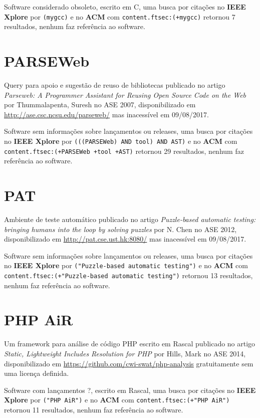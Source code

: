 Software considerado obsoleto,
escrito em C,
uma busca por citações no {\bf IEEE Xplore} por
\texttt{(mygcc)}
e no {\bf ACM} com
\texttt{content.ftsec:(+mygcc)}
retornou
7 resultados,
nenhum faz referência ao software.



\section{PARSEWeb}

Query para apoio e sugestão de reuso de bibliotecas
publicado no artigo {\it Parseweb: A Programmer Assistant for Reusing Open Source Code on the Web}
por Thummalapenta, Suresh
no ASE 2007,
disponibilizado em \url{http://ase.csc.ncsu.edu/parseweb/}
mas inacessível em 09/08/2017.

Software sem informações sobre lançamentos ou releases,
uma busca por citações no {\bf IEEE Xplore} por
\texttt{(((PARSEWeb) AND tool) AND AST)}
e no {\bf ACM} com
\texttt{content.ftsec:(+PARSEWeb +tool +AST)}
retornou
29 resultados,
nenhum faz referência ao software.



\section{PAT}

Ambiente de teste automático
publicado no artigo {\it Puzzle-based automatic testing: bringing humans into the loop by solving puzzles}
por N. Chen
no ASE 2012,
disponibilizado em \url{http://pat.cse.ust.hk:8080/}
mas inacessível em 09/08/2017.

Software sem informações sobre lançamentos ou releases,
uma busca por citações no {\bf IEEE Xplore} por
\texttt{("Puzzle-based automatic testing")}
e no {\bf ACM} com
\texttt{content.ftsec:(+"Puzzle-based automatic testing")}
retornou
13 resultados,
nenhum faz referência ao software.



\section{PHP AiR}

Um framework para análise de código PHP escrito em Rascal
publicado no artigo {\it Static, Lightweight Includes Resolution for PHP}
por Hills, Mark
no ASE 2014,
disponibilizado em \url{https://github.com/cwi-swat/php-analysis}
gratuitamente
sem uma licença definida.

Software com lançamentos ?,
escrito em Rascal,
uma busca por citações no {\bf IEEE Xplore} por
\texttt{("PHP AiR")}
e no {\bf ACM} com
\texttt{content.ftsec:(+"PHP AiR")}
retornou
11 resultados,
nenhum faz referência ao software.



